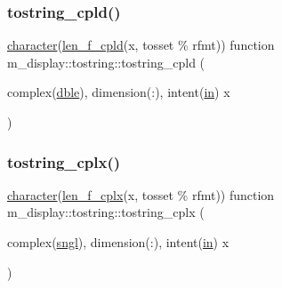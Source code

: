 \subsubsection{\texorpdfstring{tostring\+\_\+cpld()}{tostring\_cpld()}}
{\footnotesize\ttfamily \hyperlink{option__stopwatch_83_8txt_abd4b21fbbd175834027b5224bfe97e66}{character}(\hyperlink{namespacem__display_a803611d2a793f2a4aa7563b6c8295cb3}{len\+\_\+f\+\_\+cpld}(x, tosset \% rfmt)) function m\+\_\+display\+::tostring\+::tostring\+\_\+cpld (\begin{DoxyParamCaption}\item[{complex(\hyperlink{namespacem__display_a46d90b75b6ccef7ccade133e5847e815}{dble}), dimension(\+:), intent(\hyperlink{M__journal_83_8txt_afce72651d1eed785a2132bee863b2f38}{in})}]{x }\end{DoxyParamCaption})\hspace{0.3cm}{\ttfamily [private]}}

\mbox{\label{interfacem__display_1_1tostring_a7f8e6f14549e2a6e7cf18c3f67f84826}} 
\subsubsection{\texorpdfstring{tostring\+\_\+cplx()}{tostring\_cplx()}}
{\footnotesize\ttfamily \hyperlink{option__stopwatch_83_8txt_abd4b21fbbd175834027b5224bfe97e66}{character}(\hyperlink{namespacem__display_a37f268a7276f14d4975200a8f83acff3}{len\+\_\+f\+\_\+cplx}(x, tosset \% rfmt)) function m\+\_\+display\+::tostring\+::tostring\+\_\+cplx (\begin{DoxyParamCaption}\item[{complex(\hyperlink{namespacem__display_a2ac86bc535c3ccc5947dbb3109c666b5}{sngl}), dimension(\+:), intent(\hyperlink{M__journal_83_8txt_afce72651d1eed785a2132bee863b2f38}{in})}]{x }\end{DoxyParamCaption})\hspace{0.3cm}{\ttfamily [private]}}

\mbox{\label{interfacem__display_1_1tostring_a041822d03b4872b178e944f947399d01}} 
